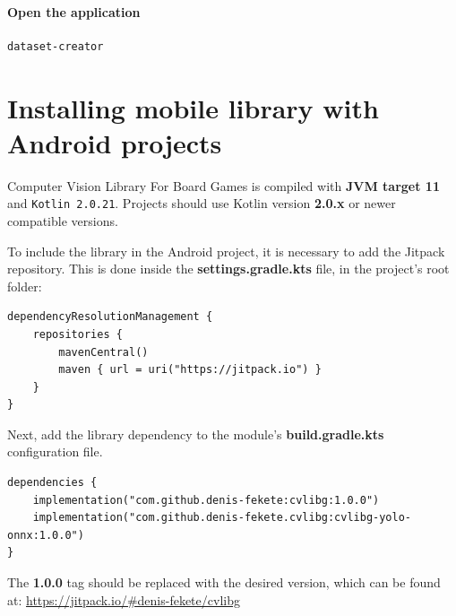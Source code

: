 \subsubsection{Open the application}
\begin{verbatim}
dataset-creator
\end{verbatim}





\chapter{Installing mobile library with Android projects}
\label{mobileInstall}
Computer Vision Library For Board Games is compiled with \textbf{JVM target 11} and \texttt{Kotlin 2.0.21}. Projects should use Kotlin version \textbf{2.0.x} or newer compatible versions.

To include the library in the Android project, it is necessary to add the Jitpack repository. This is done inside the \textbf{settings.gradle.kts} file, in the project's root folder:
\begin{verbatim}
dependencyResolutionManagement {
    repositories {
        mavenCentral()
        maven { url = uri("https://jitpack.io") }
    }
}
\end{verbatim}

Next, add the library dependency to the module's \textbf{build.gradle.kts} configuration file. 
\begin{verbatim}
dependencies {
    implementation("com.github.denis-fekete:cvlibg:1.0.0")
    implementation("com.github.denis-fekete.cvlibg:cvlibg-yolo-onnx:1.0.0")
}
\end{verbatim}

The \textbf{1.0.0} tag should be replaced with the desired version, which can be found at: \url{https://jitpack.io/#denis-fekete/cvlibg}



% 